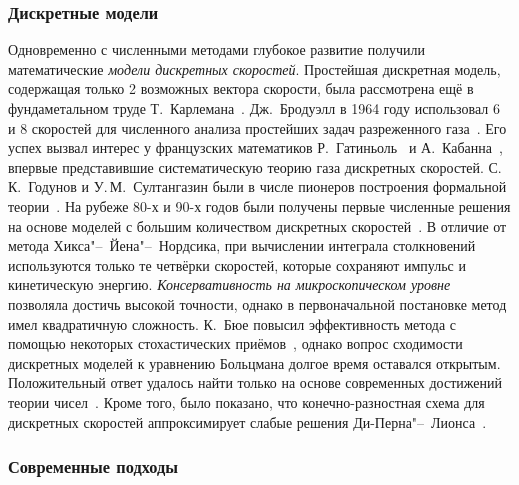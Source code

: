 \subsubsection{Дискретные модели}

Одновременно с численными методами глубокое развитие получили математические \emph{модели дискретных скоростей}.
Простейшая дискретная модель, содержащая только 2 возможных вектора скорости,
была рассмотрена ещё в фундаметальном труде Т.~Карлемана~\cite{Carleman1957}.
Дж.~Бродуэлл в 1964 году использовал 6 и 8 скоростей для численного анализа простейших задач
разреженного газа~\cite{Broadwell1964shock, Broadwell1964shear}.
Его успех вызвал интерес у французских математиков Р.~Гатиньоль~\cite{Gatignol1975} и А.~Кабанна~\cite{Cabannes1980},
впервые представившие систематическую теорию газа дискретных скоростей.
С.\,К.~Годунов и У.\,М.~Султангазин были в числе пионеров построения формальной теории~\cite{Sultangazin1971}.
На рубеже 80-х и 90-х годов были получены первые численные решения на основе моделей
с большим количеством дискретных скоростей~\cite{Goldstein1989, Inamuro1990}.
В отличие от метода Хикса"--~Йена"--~Нордсика, при вычислении интеграла столкновений используются
только те четвёрки скоростей, которые сохраняют импульс и кинетическую энергию.
\emph{Консервативность на микроскопическом уровне} позволяла достичь высокой точности,
однако в первоначальной постановке метод имел квадратичную сложность.
К.~Бюе повысил эффективность метода с помощью некоторых стохастических приёмов~\cite{Buet1996},
однако вопрос сходимости дискретных моделей к уравнению Больцмана долгое время оставался открытым.
Положительный ответ удалось найти только на основе современных достижений теории чисел~\cite{Palczewski1997}.
Кроме того, было показано, что конечно-разностная схема для дискретных скоростей
аппроксимирует слабые решения Ди-Перна"--~Лионса~\cite{Mischler1997, Palczewski1998}.

\subsubsection{Современные подходы}



